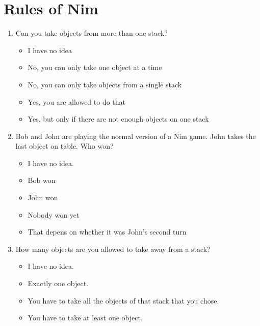 \section{Rules of Nim}
\begin{framed}
\begin{enumerate}
	\item Can you take objects from more than one stack?
		\begin{itemize}
			\item I have no idea
			\item No, you can only take one object at a time
			\item No, you can only take objects from a single stack
			\item Yes, you are allowed to do that
			\item Yes, but only if there are not enough objects on one stack
		\end{itemize}
	\item Bob and John are playing the normal version of a Nim game. John takes
		the last object on table. Who won?
		\begin{itemize}
			\item I have no idea.
			\item Bob won
			\item John won
			\item Nobody won yet
			\item That depens on whether it was John's second turn
		\end{itemize}
	\item How many objects are you allowed to take away from a stack?
		\begin{itemize}
			\item I have no idea.
			\item Exactly one object.
			\item You have to take all the objects of that stack that you chose.
			\item You have to take at least one object.
		\end{itemize}
\end{enumerate}
\end{framed}
